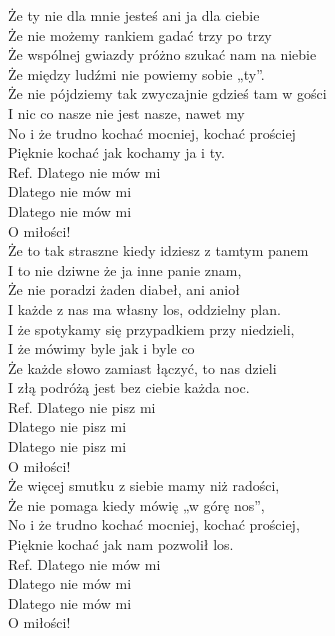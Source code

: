 
Że ty nie dla mnie jesteś ani ja dla ciebie  \\
Że nie możemy rankiem gadać trzy po trzy  \\
Że wspólnej gwiazdy próżno szukać nam na niebie  \\
Że między ludźmi nie powiemy sobie „ty”. \\
\hops
Że nie pójdziemy tak zwyczajnie gdzieś tam w gości  \\
I nic co nasze nie jest nasze, nawet my  \\
No i że trudno kochać mocniej, kochać prościej  \\
Pięknie kochać jak kochamy ja i ty. \\
\hops
Ref. Dlatego nie mów mi  \\
 Dlatego nie mów mi  \\
 Dlatego nie mów mi  \\
 O miłości! \\
\hops
Że to tak straszne kiedy idziesz z tamtym panem  \\
I to nie dziwne że ja inne panie znam, \\
Że nie poradzi żaden diabeł, ani anioł  \\
I każde z nas ma własny los, oddzielny plan.  \\
\hops
I że spotykamy się przypadkiem przy niedzieli,  \\
I że mówimy byle jak i byle co  \\
Że każde słowo zamiast łączyć, to nas dzieli \\
I złą podróżą jest bez ciebie każda noc. \\
\hops
Ref. Dlatego nie pisz mi  \\
 Dlatego nie pisz mi  \\
 Dlatego nie pisz mi  \\
 O miłości! \\
\hops
Że więcej smutku z siebie mamy niż radości,  \\
Że nie pomaga kiedy mówię „w górę nos”,  \\
No i że trudno kochać mocniej, kochać prościej, \\
Pięknie kochać jak nam pozwolił los. \\
\hops
Ref. Dlatego nie mów mi  \\
 Dlatego nie mów mi  \\
 Dlatego nie mów mi  \\
 O miłości!